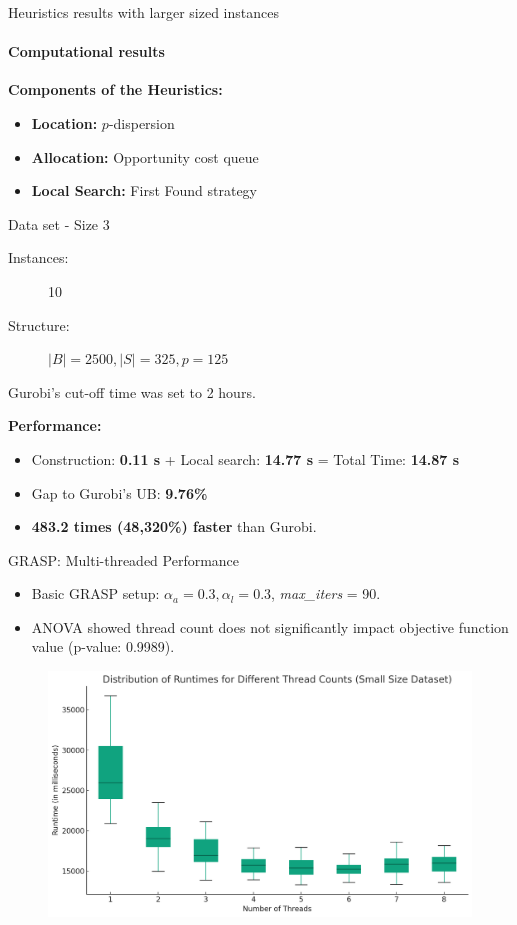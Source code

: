 \documentclass{beamer}
\begin{document}
\begin{frame}{Heuristics results with larger sized instances}
    \framesubtitle{Computational results}
    
    \textbf{Components of the Heuristics:}
    \begin{itemize}
        \item \textbf{Location:} $p$-dispersion
        \item \textbf{Allocation:} Opportunity cost queue
        \item \textbf{Local Search:} First Found strategy
    \end{itemize}
    
    \begin{block}{Data set - Size 3}
    \begin{description}
        \item[Instances:] 10
        \item[Structure:] $\lvert B \rvert = 2500, \lvert S \rvert = 325, p = 125$
    \end{description}
        Gurobi's cut-off time was set to 2 hours.
    \end{block}

    \textbf{Performance:}
    \begin{itemize}
        \item Construction: \textbf{0.11 s} + Local search: \textbf{14.77 s} = Total Time: \textbf{14.87 s}
        \item Gap to Gurobi's UB: \textbf{9.76\%}
        \item \textbf{483.2 times (48,320\%) faster} than Gurobi.
    \end{itemize}
\end{frame}
\begin{frame}{GRASP: Multi-threaded Performance}
    \begin{itemize}
        \item Basic GRASP setup: $\alpha_a=0.3, \alpha_l=0.3$, \textit{max\_iters} = 90.
        \item ANOVA showed thread count does not significantly impact objective function value (p-value: 0.9989).
    \end{itemize}
    \begin{figure}
        \centering
        \includegraphics[scale=0.31]{boxplot_small.png}
    \end{figure}
\end{frame}
\end{document}
